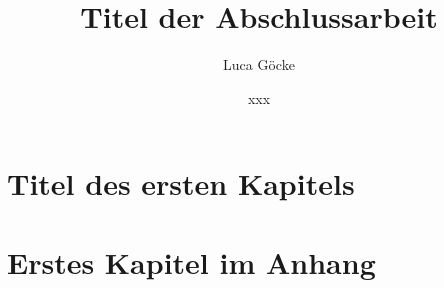 \documentclass[pstricks,siunitx,addfonts,theorem,font=palatino,british]{tumphthesis}
\title{Titel der Abschlussarbeit}
\author{Luca Göcke}
\date{xxx}
\begin{document}

\frontmatter
\maketitle
\tableofcontents


\mainmatter
\chapter{Titel des ersten Kapitels}


\appendix
\chapter{Erstes Kapitel im Anhang}

\backmatter
\printbibliography
\end{document}

